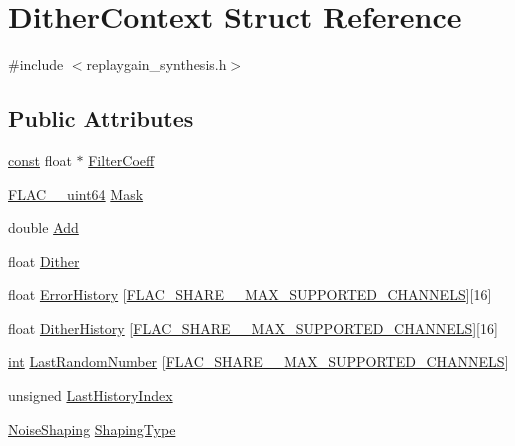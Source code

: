 \hypertarget{struct_dither_context}{}\section{Dither\+Context Struct Reference}
\label{struct_dither_context}


{\ttfamily \#include $<$replaygain\+\_\+synthesis.\+h$>$}

\subsection*{Public Attributes}
\begin{DoxyCompactItemize}
\item 
\hyperlink{getopt1_8c_a2c212835823e3c54a8ab6d95c652660e}{const} float $\ast$ \hyperlink{struct_dither_context_ab3784bc63bc8949efb2731de73a5b347}{Filter\+Coeff}
\item 
\hyperlink{ordinals_8h_aa78c8c70a3eb8a58af7436f278acde8e}{F\+L\+A\+C\+\_\+\+\_\+uint64} \hyperlink{struct_dither_context_abb09fde51b8472ec21274b4fa595c132}{Mask}
\item 
double \hyperlink{struct_dither_context_a81d1334271585e5249e3295565453519}{Add}
\item 
float \hyperlink{struct_dither_context_a2bdd64b539541ea62a481830ec80b1ef}{Dither}
\item 
float \hyperlink{struct_dither_context_a49ff3c226e326db2b683654f71a611b2}{Error\+History} \mbox{[}\hyperlink{replaygain__synthesis_8h_aaa75e1911cdd65a4462bee073bb19822}{F\+L\+A\+C\+\_\+\+S\+H\+A\+R\+E\+\_\+\+\_\+\+M\+A\+X\+\_\+\+S\+U\+P\+P\+O\+R\+T\+E\+D\+\_\+\+C\+H\+A\+N\+N\+E\+LS}\mbox{]}\mbox{[}16\mbox{]}
\item 
float \hyperlink{struct_dither_context_acbb902c41c907f29d55f3f3a595aa2c6}{Dither\+History} \mbox{[}\hyperlink{replaygain__synthesis_8h_aaa75e1911cdd65a4462bee073bb19822}{F\+L\+A\+C\+\_\+\+S\+H\+A\+R\+E\+\_\+\+\_\+\+M\+A\+X\+\_\+\+S\+U\+P\+P\+O\+R\+T\+E\+D\+\_\+\+C\+H\+A\+N\+N\+E\+LS}\mbox{]}\mbox{[}16\mbox{]}
\item 
\hyperlink{xmltok_8h_a5a0d4a5641ce434f1d23533f2b2e6653}{int} \hyperlink{struct_dither_context_a52d31acfd4fb1eb880bca836b70aafcd}{Last\+Random\+Number} \mbox{[}\hyperlink{replaygain__synthesis_8h_aaa75e1911cdd65a4462bee073bb19822}{F\+L\+A\+C\+\_\+\+S\+H\+A\+R\+E\+\_\+\+\_\+\+M\+A\+X\+\_\+\+S\+U\+P\+P\+O\+R\+T\+E\+D\+\_\+\+C\+H\+A\+N\+N\+E\+LS}\mbox{]}
\item 
unsigned \hyperlink{struct_dither_context_ab1e929de991885e8740b28fa16bf5dca}{Last\+History\+Index}
\item 
\hyperlink{replaygain__synthesis_8h_ac9742b8037806648f7cf5e6ab62a42df}{Noise\+Shaping} \hyperlink{struct_dither_context_a45c49e20d4990b7a1942eab165c90f61}{Shaping\+Type}
\end{DoxyCompactItemize}


